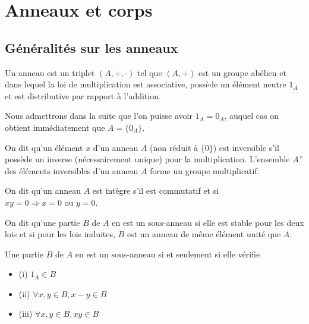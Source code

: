 \section{Anneaux et corps}

\subsection{Généralités sur les anneaux}

\begin{de}
Un anneau est un triplet $(A,+,\cdot)$ tel que $(A,+)$ est un
groupe abélien et dans lequel la loi de multiplication est associative,
possède un élément neutre $1_A$ et est distributive par rapport à
l'addition.
\end{de}

\begin{rem}
Nous admettrons dans la suite que l'on puisse avoir
$1_A = 0_A$, auquel cas on obtient immédiatement que $A = \{0_A\}$.
\end{rem}

\begin{de}
On dit qu'un élément $x$ d'un anneau $A$ (non réduit à
$\{0\}$) est inversible s'il possède un
inverse (nécessairement unique) pour la multiplication. L'ensemble
$A^\times$ des éléments inversibles d'un anneau $A$ forme un groupe
multiplicatif.
\end{de}

\begin{de}
On dit qu'un anneau $A$ est intègre s'il est commutatif
et si $xy = 0 \Rightarrow x = 0 \text{ ou } y = 0$.
\end{de}

\begin{de}
On dit qu'une partie $B$ de $A$ en est un sous-anneau si
elle est stable pour les deux lois et si pour les lois induites, $B$ est
un anneau de même élément unité que $A$.
\end{de}

\begin{prop}
Une partie $B$ de $A$ en est un sous-anneau si et
seulement si elle vérifie

\begin{itemize}
\itemsep1pt\parskip0pt
\item
  (i) $1_A \in B$
\item
  (ii) $\forall x,y \in B, x - y \in B$
\item
  (iii) $\forall x,y \in B, xy \in B$
\end{itemize}
\end{prop}

